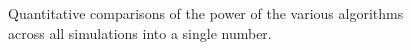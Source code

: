 \documentclass[11pt]{article}
\begin{document}
\begin{figure}[htbp]
\hfil
{}
\hfil
{}
\hfil
{}
\caption{Quantitative comparisons of the power of the various algorithms across all simulations into a single number.  
}
\end{figure}
\end{document}
